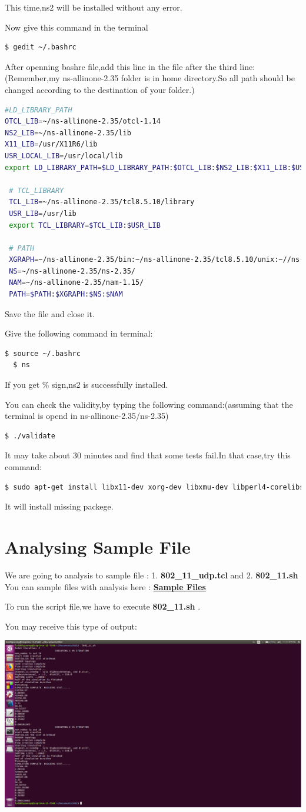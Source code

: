 \documentclass[hidelinks,12pt]{report}
\begin{document}
This time,ns2 will be installed without any error.

Now give this command in the terminal
\begin{lstlisting}[language=bash]
  $ gedit ~/.bashrc 
\end{lstlisting}
After openning bashrc file,add this line in the file after the third line:(Remember,my ns-allinone-2.35 folder is in home directory.So all path should be changed according to the destination of your folder.)
\begin{lstlisting}[language=bash]
#LD_LIBRARY_PATH
OTCL_LIB=~/ns-allinone-2.35/otcl-1.14
NS2_LIB=~/ns-allinone-2.35/lib
X11_LIB=/usr/X11R6/lib
USR_LOCAL_LIB=/usr/local/lib
export LD_LIBRARY_PATH=$LD_LIBRARY_PATH:$OTCL_LIB:$NS2_LIB:$X11_LIB:$USR_LOCAL_LIB

 # TCL_LIBRARY
 TCL_LIB=~/ns-allinone-2.35/tcl8.5.10/library
 USR_LIB=/usr/lib
 export TCL_LIBRARY=$TCL_LIB:$USR_LIB

 # PATH
 XGRAPH=~/ns-allinone-2.35/bin:~/ns-allinone-2.35/tcl8.5.10/unix:~//ns-allinone-2.35/tk8.5.10/unix
 NS=~/ns-allinone-2.35/ns-2.35/
 NAM=~/ns-allinone-2.35/nam-1.15/
 PATH=$PATH:$XGRAPH:$NS:$NAM
\end{lstlisting}
Save the file and close it.

Give the following command in terminal:
\begin{lstlisting}[language=bash]
  $ source ~/.bashrc 
  $ ns
\end{lstlisting}
If you get \% sign,ns2 is successfully installed.

You can check the validity,by typing the following command:(assuming that the terminal is opend in ns-allinone-2.35/ns-2.35)
\begin{lstlisting}[language=bash]
  $ ./validate
\end{lstlisting}
It may take about 30 minutes and find that some tests fail.In that case,try this command:
\begin{lstlisting}[language=bash]
  $ sudo apt-get install libx11-dev xorg-dev libxmu-dev libperl4-corelibs-perl
\end{lstlisting}
It will install missing packege.
\chapter{Analysing Sample File}
We are going to analysis to sample file : 1. \textbf{802\_11\_udp.tcl} and 2. \textbf{802\_11.sh}
You can sample files with analysis here : \href{https://github.com/lsiddiqsunny/CSE-322-Computer-Networks-Sessional/tree/master/NS2\%20Offline/Sample}{\textbf{Sample Files}}

To run the script file,we have to execute\textbf{ 802\_11.sh} .

You may receive this type of output:

\includegraphics[width=1\textwidth]{ss1.png}
\end{document}
